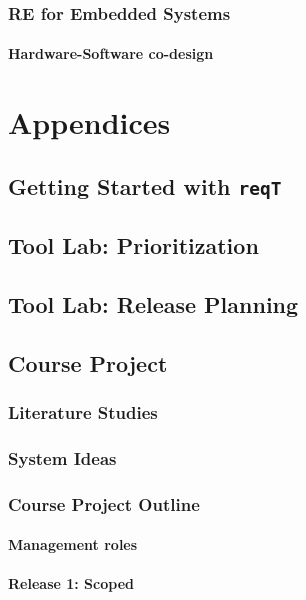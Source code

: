 \documentclass{reqengbook}
\begin{document}
\section{RE for Embedded Systems}
\subsection{Hardware-Software co-design}

\part{Appendices}\appendix

\chapter{Getting Started with \texttt{reqT}}

\chapter{Tool Lab: Prioritization}

\chapter{Tool Lab: Release Planning}

\chapter{Course Project}

\section{Literature Studies}

\section{System Ideas}

\section{Course Project Outline}
\subsection{Management roles}
\subsection{Release 1: Scoped}
\end{document}
